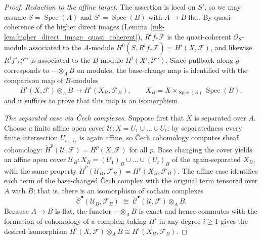 \begin{proof}
  \emph{Reduction to the affine target.} The assertion is local on \(S'\), so we
  may assume \(S = \operatorname{Spec}(A)\) and \(S' = \operatorname{Spec}(B)\) with
  \(A \to B\) flat. By quasi-coherence of the higher direct images
  (Lemma~\ref{mk-lem:higher_direct_image_quasi_coherent}), \(R^i f_*\mathcal{F}\) is
  the quasi-coherent \(\mathcal{O}_S\)-module associated to the \(A\)-module
  \(H^0(S, R^i f_*\mathcal{F}) = H^i(X, \mathcal{F})\), and likewise
  \(R^i f'_*\mathcal{F}'\) is associated to the \(B\)-module
  \(H^i(X', \mathcal{F}')\). Since pullback along \(g\) corresponds to
  \(- \otimes_A B\) on modules, the base-change map is identified with the
  comparison map of \(B\)-modules
  \[
    H^i(X, \mathcal{F}) \otimes_A B \longrightarrow H^i(X_B, \mathcal{F}_B),
    \qquad X_B = X \times_{\operatorname{Spec}(A)} \operatorname{Spec}(B),
  \]
  and it suffices to prove that this map is an isomorphism.

  \medskip
  \emph{The separated case via {\v C}ech complexes.} Suppose first that \(X\) is
  separated over \(A\). Choose a finite affine open cover
  \(\mathcal{U} : X = U_1 \cup \dots \cup U_t\); by separatedness every finite
  intersection \(U_{i_0 \dots i_p}\) is again affine, so {\v C}ech cohomology
  computes sheaf cohomology:
  \(\check{H}^p(\mathcal{U}, \mathcal{F}) = H^p(X, \mathcal{F})\) for all \(p\).
  Base changing the cover yields an affine open cover
  \(\mathcal{U}_B : X_B = (U_1)_B \cup \dots \cup (U_t)_B\) of the again-separated
  \(X_B\), with the same property
  \(\check{H}^p(\mathcal{U}_B, \mathcal{F}_B) = H^p(X_B, \mathcal{F}_B)\). The
  affine case identifies each term of the base-changed {\v C}ech complex with the
  original term tensored over \(A\) with \(B\); that is, there is an isomorphism of
  cochain complexes
  \[
    \check{\mathcal{C}}^\bullet(\mathcal{U}_B, \mathcal{F}_B) \;\cong\;
    \check{\mathcal{C}}^\bullet(\mathcal{U}, \mathcal{F}) \otimes_A B .
  \]
  Because \(A \to B\) is flat, the functor \(- \otimes_A B\) is exact and hence
  commutes with the formation of cohomology of a complex; taking \(H^i\) in any
  degree \(i \geq 1\) gives the desired isomorphism
  \(H^i(X, \mathcal{F}) \otimes_A B \cong H^i(X_B, \mathcal{F}_B)\).


\end{proof}
